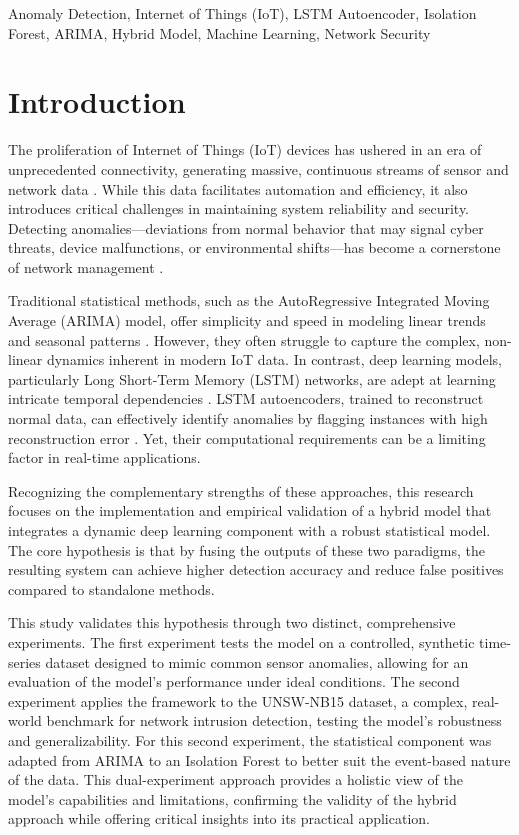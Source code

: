 \documentclass[conference]{IEEEtran}
\begin{document}
\begin{IEEEkeywords}
Anomaly Detection, Internet of Things (IoT), LSTM Autoencoder, Isolation Forest, ARIMA, Hybrid Model, Machine Learning, Network Security
\end{IEEEkeywords}

\section{Introduction}
The proliferation of Internet of Things (IoT) devices has ushered in an era of unprecedented connectivity, generating massive, continuous streams of sensor and network data \cite{b6}. While this data facilitates automation and efficiency, it also introduces critical challenges in maintaining system reliability and security. Detecting anomalies—deviations from normal behavior that may signal cyber threats, device malfunctions, or environmental shifts—has become a cornerstone of network management \to \cite{b7}.

Traditional statistical methods, such as the AutoRegressive Integrated Moving Average (ARIMA) model, offer simplicity and speed in modeling linear trends and seasonal patterns \cite{b3}. However, they often struggle to capture the complex, non-linear dynamics inherent in modern IoT data. In contrast, deep learning models, particularly Long Short-Term Memory (LSTM) networks, are adept at learning intricate temporal dependencies \cite{b4}. LSTM autoencoders, trained to reconstruct normal data, can effectively identify anomalies by flagging instances with high reconstruction error \cite{b5}. Yet, their computational requirements can be a limiting factor in real-time applications.

Recognizing the complementary strengths of these approaches, this research focuses on the implementation and empirical validation of a hybrid model that integrates a dynamic deep learning component with a robust statistical model. The core hypothesis is that by fusing the outputs of these two paradigms, the resulting system can achieve higher detection accuracy and reduce false positives compared to standalone methods.

This study validates this hypothesis through two distinct, comprehensive experiments. The first experiment tests the model on a controlled, synthetic time-series dataset designed to mimic common sensor anomalies, allowing for an evaluation of the model's performance under ideal conditions. The second experiment applies the framework to the UNSW-NB15 dataset, a complex, real-world benchmark for network intrusion detection, testing the model's robustness and generalizability. For this second experiment, the statistical component was adapted from ARIMA to an Isolation Forest to better suit the event-based nature of the data. This dual-experiment approach provides a holistic view of the model's capabilities and limitations, confirming the validity of the hybrid approach while offering critical insights into its practical application.
\end{document}
